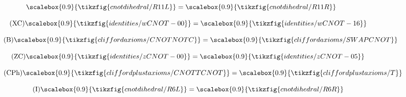\begin{figure}[ht]
{\begin{minipage}{0.98\textwidth}
\begin{minipage}[c]{0.34\textwidth}
\begin{equation}
            \scalebox{0.9}{\tikzfig{cnotdihedral/R11L}}
            =
            \scalebox{0.9}{\tikzfig{cnotdihedral/R11R}}
            \end{equation}
        \end{minipage}
        \begin{minipage}[c]{0.34\textwidth}
            \centering
            \begin{equation}\tag{XC}\label{new-R3}
            \scalebox{0.9}{\tikzfig{identities/wCNOT-00}}
            =
            \scalebox{0.9}{\tikzfig{identities/wCNOT-16}}
            \end{equation}
        \end{minipage}
        \begin{minipage}[c]{0.29\textwidth}
            \centering
            \begin{equation}\tag{B}\label{new-R5}
            \scalebox{0.9}{\tikzfig{cliffordaxioms/CNOTNOTC}}
            =
            \scalebox{0.9}{\tikzfig{cliffordaxioms/SWAPCNOT}}
            \end{equation}
        \end{minipage}\vspace{-0.6em}
        \begin{minipage}[c]{0.35\textwidth}
            \centering
            \begin{equation}\tag{ZC}\label{new-R8}
            \scalebox{0.9}{\tikzfig{identities/zCNOT-00}}
            =
            \scalebox{0.9}{\tikzfig{identities/zCNOT-05}}
            \end{equation}
        \end{minipage}
        \begin{minipage}[c]{0.29\textwidth}
            \centering
            \begin{equation}\tag{CPh}\label{cnot-R12}
            \scalebox{0.9}{\tikzfig{cliffordplustaxioms/CNOTTCNOT}}
            =
            \scalebox{0.9}{\tikzfig{cliffordplustaxioms/T}}
            \end{equation}
        \end{minipage}\vspace{-0.6em}
        \begin{minipage}[c]{0.29\textwidth}
            \centering
            \begin{equation}\tag{I}\label{cnot-R6}
            \scalebox{0.9}{\tikzfig{cnotdihedral/R6L}}
            =
            \scalebox{0.9}{\tikzfig{cnotdihedral/R6R}}
            \end{equation}

\end{minipage}
\end{minipage}}
\end{figure}
